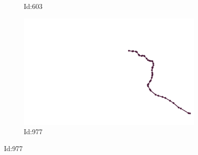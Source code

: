 \documentclass[12pt,twoside]{report}
\begin{document}
\begin{figure}
\begin{subfigure}[b]{0.20\textwidth}
\caption{Id:603}
\end{subfigure}
\begin{subfigure}[b]{0.20\textwidth}
\centering
\includegraphics[width=\textwidth]{../../trajectories/977.png}
\caption{Id:977}
\end{subfigure}
\end{figure}
\end{document}
